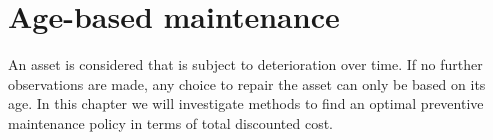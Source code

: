 

%
%


\chapter{Age-based maintenance}\label{chapter:AgeBased}
An asset is considered that is subject to deterioration over time.
If no further observations are made, any choice to repair the asset can only be based on its age.
In this chapter we will investigate methods to find an optimal preventive maintenance policy in terms of total discounted cost.







